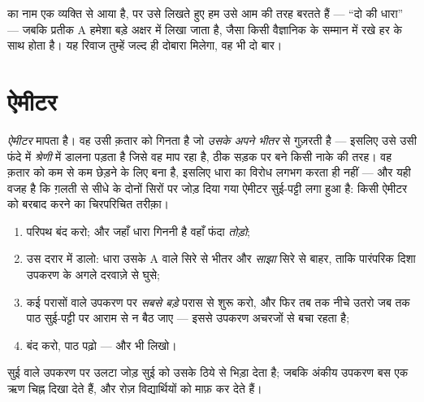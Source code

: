 \begin{remark}[व्यक्ति और मात्रक]\label{rem:g8:intensity-ammeter:person}
 का नाम एक व्यक्ति से आया है, पर उसे लिखते हुए हम उसे आम 
की तरह बरतते हैं --- ``दो  की धारा'' --- जबकि प्रतीक \unit{A}
हमेशा बड़े अक्षर में लिखा जाता है, जैसा किसी वैज्ञानिक के सम्मान में
रखे हर  के साथ होता है। यह रिवाज तुम्हें जल्द ही दोबारा मिलेगा,
वह भी दो बार।
\end{remark}

\section{ऐमीटर}

\begin{definition}[ऐमीटर]\label{def:g8:intensity-ammeter:ammeter}
\emph{ऐमीटर}  मापता है। वह उसी क़तार को गिनता है
जो \emph{उसके अपने भीतर} से गुज़रती है --- इसलिए उसे उसी फंदे में
\emph{श्रेणी} में डालना पड़ता है जिसे वह माप रहा है, ठीक सड़क पर बने
किसी नाके की तरह। वह क़तार को कम से कम छेड़ने के लिए बना है, इसलिए
धारा का विरोध लगभग करता ही नहीं --- और यही वजह है कि ग़लती से सीधे
 के दोनों सिरों पर जोड़ दिया गया ऐमीटर सुई-पट्टी लगा हुआ 
है: किसी ऐमीटर को बरबाद करने का चिरपरिचित तरीक़ा।
\end{definition}

\begin{method}[तीव्रता मापना]\label{met:g8:intensity-ammeter:measure}
\begin{enumerate}
  \item परिपथ बंद करो; और जहाँ धारा गिननी है वहाँ फंदा \emph{तोड़ो};
  \item उस दरार में  डालो: धारा उसके \unit{A} वाले सिरे से भीतर
        और \emph{साझा} सिरे से बाहर, ताकि पारंपरिक दिशा उपकरण के
        अगले दरवाज़े से घुसे;
  \item कई परासों वाले उपकरण पर \emph{सबसे बड़े} परास से शुरू करो, और
        फिर तब तक नीचे उतरो जब तक पाठ सुई-पट्टी पर आराम से न बैठ जाए
        --- इससे उपकरण अचरजों से बचा रहता है;
  \item {} बंद करो, पाठ पढ़ो --- और  भी लिखो।
\end{enumerate}
सुई वाले उपकरण पर उलटा जोड़ सुई को उसके ठिये से भिड़ा देता है; जबकि
अंकीय उपकरण बस एक ऋण चिह्न दिखा देते हैं, और रोज़ विद्यार्थियों को माफ़
कर देते हैं।
\end{method}

